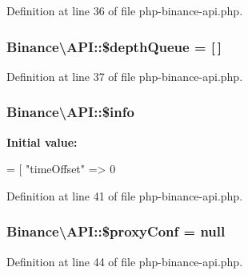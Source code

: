Definition at line 36 of file php-\/binance-\/api.\-php.

\hypertarget{classBinance_1_1API_ab04600479e07a4af0ead9ba84772bde1}{
\subsubsection[{\$depth\-Queue}]{\setlength{\rightskip}{0pt plus 5cm}Binance\textbackslash{}\-A\-P\-I\-::\$depth\-Queue = \mbox{[}$\,$\mbox{]}\hspace{0.3cm}{\ttfamily [protected]}}}\label{classBinance_1_1API_ab04600479e07a4af0ead9ba84772bde1}


Definition at line 37 of file php-\/binance-\/api.\-php.

\hypertarget{classBinance_1_1API_a8d15ac7cb74ac52f8f008e61aa7cab89}{
\subsubsection[{\$info}]{\setlength{\rightskip}{0pt plus 5cm}Binance\textbackslash{}\-A\-P\-I\-::\$info\hspace{0.3cm}{\ttfamily [protected]}}}\label{classBinance_1_1API_a8d15ac7cb74ac52f8f008e61aa7cab89}
{\bfseries Initial value\-:}
\begin{DoxyCode}
= [
        \textcolor{stringliteral}{"timeOffset"} => 0
\end{DoxyCode}


Definition at line 41 of file php-\/binance-\/api.\-php.

\hypertarget{classBinance_1_1API_a1415587257942c2b5af22c642ff58005}{
\subsubsection[{\$proxy\-Conf}]{\setlength{\rightskip}{0pt plus 5cm}Binance\textbackslash{}\-A\-P\-I\-::\$proxy\-Conf = null\hspace{0.3cm}{\ttfamily [protected]}}}\label{classBinance_1_1API_a1415587257942c2b5af22c642ff58005}


Definition at line 44 of file php-\/binance-\/api.\-php.

